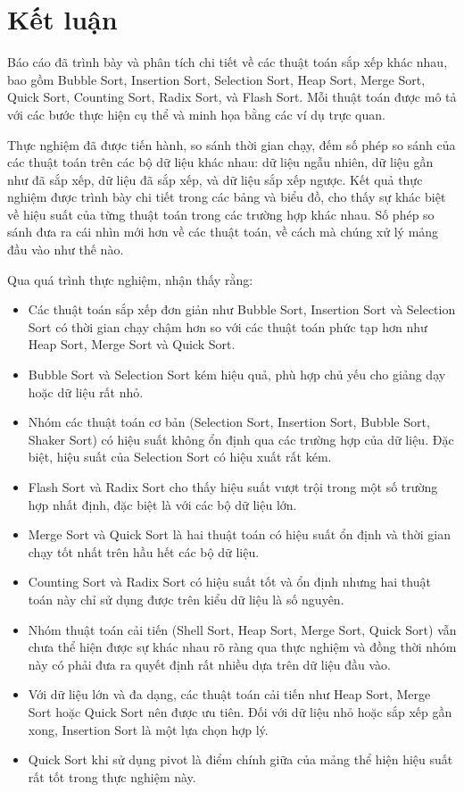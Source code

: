 \section{Kết luận}

Báo cáo đã trình bày và phân tích chi tiết về các thuật toán sắp xếp khác nhau, bao gồm Bubble Sort, Insertion Sort, Selection Sort, Heap Sort, Merge Sort, Quick Sort, Counting Sort, Radix Sort, và Flash Sort. Mỗi thuật toán được mô tả với các bước thực hiện cụ thể và minh họa bằng các ví dụ trực quan.

Thực nghiệm đã được tiến hành, so sánh thời gian chạy, đếm số phép so sánh của các thuật toán trên các bộ dữ liệu khác nhau: dữ liệu ngẫu nhiên, dữ liệu gần như đã sắp xếp, dữ liệu đã sắp xếp, và dữ liệu sắp xếp ngược. Kết quả thực nghiệm được trình bày chi tiết trong các bảng và biểu đồ, cho thấy sự khác biệt về hiệu suất của từng thuật toán trong các trường hợp khác nhau. Số phép so sánh đưa ra cái nhìn mới hơn về các thuật toán, về cách mà chúng xử lý mảng đầu vào như thế nào.

Qua quá trình thực nghiệm, nhận thấy rằng:
\begin{itemize}
    \item Các thuật toán sắp xếp đơn giản như Bubble Sort, Insertion Sort và Selection Sort có thời gian chạy chậm hơn so với các thuật toán phức tạp hơn như Heap Sort, Merge Sort và Quick Sort.
    \item Bubble Sort và Selection Sort kém hiệu quả, phù hợp chủ yếu cho giảng dạy hoặc dữ liệu rất nhỏ.
    \item Nhóm các thuật toán cơ bản (Selection Sort, Insertion Sort, Bubble Sort, Shaker Sort) có hiệu suất không ổn định qua các trường hợp của dữ liệu. Đặc biệt, hiệu suất của Selection Sort có hiệu xuất rất kém.
    \item Flash Sort và Radix Sort cho thấy hiệu suất vượt trội trong một số trường hợp nhất định, đặc biệt là với các bộ dữ liệu lớn.
    \item Merge Sort và Quick Sort là hai thuật toán có hiệu suất ổn định và thời gian chạy tốt nhất trên hầu hết các bộ dữ liệu.
    \item Counting Sort và Radix Sort có hiệu suất tốt và ổn định nhưng hai thuật toán này chỉ sử dụng được trên kiểu dữ liệu là số nguyên.
    \item Nhóm thuật toán cải tiến (Shell Sort, Heap Sort, Merge Sort, Quick Sort) vẫn chưa thể hiện được sự khác nhau rõ ràng qua thực nghiệm và đồng thời nhóm này có phải đưa ra quyết định rất nhiều dựa trên dữ liệu đầu vào.
    \item Với dữ liệu lớn và đa dạng, các thuật toán cải tiến như Heap Sort, Merge Sort hoặc Quick Sort nên được ưu tiên. Đối với dữ liệu nhỏ hoặc sắp xếp gần xong, Insertion Sort là một lựa chọn hợp lý.
    \item Quick Sort khi sử dụng pivot là điểm chính giữa của mảng thể hiện hiệu suất rất tốt trong thực nghiệm này.
\end{itemize}

